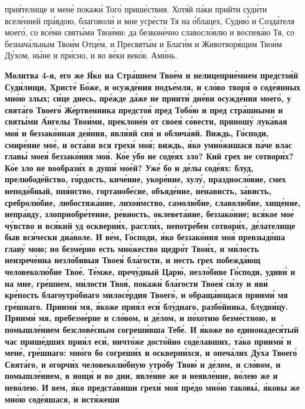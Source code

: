 прия́телище и мене́ покажи́ Того́ прише́ствия. Хотя́й па́ки прийти суди́ти
вселе́нней пра́вдою, благоволи́ и мне усре́сти Тя на о́блацех, Судию́ и
Созда́теля моего́, со все́ми святы́ми Твои́ми: да безконе́чно славосло́влю и
воспева́ю Тя, со безнача́льным Твои́м Отце́м, и Пресвяты́м и Благи́м
и Животворя́щим Твои́м Ду́хом, ны́не и при́сно, и во ве́ки веко́в.
Ами́нь.



 

\bfseries Молитва 4-я, его же\normalfont{}  Я́ко на Стра́шнем Твое́м и нелицеприе́мнем
предстоя́й Суди́лищи, Христе́ Бо́же, и осужде́ния подъе́мля, и сло́во творя́ о
соде́янных мно́ю злых; си́це днесь, пре́жде да́же не приити́ дне́ви осужде́ния
моего́, у свята́го Твоего́ Же́ртвенника предстоя́ пред Тобо́ю и пред
стра́шными и святы́ми А́нгелы Твои́ми, преклоне́н от своея́ со́вести, приношу́
лука́вая моя́ и беззако́нная дея́ния, явля́яй сия́ и облича́яй. Виждь, Го́споди,
смире́ние мое́, и оста́ви вся грехи́ моя́; виждь, я́ко умно́жишася па́че влас
главы́ моея́ беззако́ния моя́. Ко́е у́бо не соде́ях зло? Кий грех не сотвори́х?
Ко́е зло не вообрази́х в души́ мое́й? Уже́ бо и де́лы соде́ях: блуд,
прелюбоде́йство, го́рдость, киче́ние, укоре́ние, хулу́, праздносло́вие, смех
неподо́бный, пия́нство, гортанобе́сие, объяде́ние, не́нависть, за́висть,
сребролю́бие, любостяжа́ние, лихои́мство, самолю́бие, славолю́бие, хище́ние,
непра́вду, злоприобре́тение, ре́вность, оклевета́ние, беззако́ние; вся́кое мое́
чу́вство и вся́кий уд оскверни́х, растли́х, непотре́бен сотвори́х, де́лателище
быв вся́чески диа́воле. И ве́м, Го́споди, я́ко беззако́ния моя́ превзыдо́ша
главу́ мою; но безме́рно есть мно́жество щедро́т Твои́х, и ми́лость
неизрече́нна незло́бивыя Твоея́ бла́гости, и несть грех побежда́ющ
человеколю́бие Твое́. Те́мже, пречу́дный Царю́, незло́биве Го́споди, удиви́ и
на мне, гре́шнем, ми́лости Твоя́, покажи́ бла́гости Твоея́ си́лу и яви́
кре́пость благоутро́бнаго милосе́рдия Твоего́, и обраща́ющася приими́
мя гре́шнаго. Приими́ мя, я́коже прия́л еси́ блу́днаго, разбо́йника,
блудни́цу. Приими́ мя, пребезме́рне и сло́вом, и де́лом, и по́хотию
безме́стною, и помышле́нием безслове́сным согреши́вша Тебе́. И я́коже во
единонадеся́тый час прише́дших прия́л еси́, ничто́же досто́йно соде́лавших,
та́ко приими́ и мене́, гре́шнаго: мно́го бо согреши́х и оскверни́хся, и
опеча́лих Ду́ха Твоего́ Свята́го, и огорчи́х человеколю́бную утро́бу Твою́
и де́лом, и сло́вом, и помышле́нием, в нощи́ и во дни, явле́нне же
и неявле́нне, во́лею же и нево́лею. И вем, я́ко предста́виши грехи́
моя́ пре́до мно́ю таковы́, я́ковы же мно́ю соде́яшася, и истя́жеши

